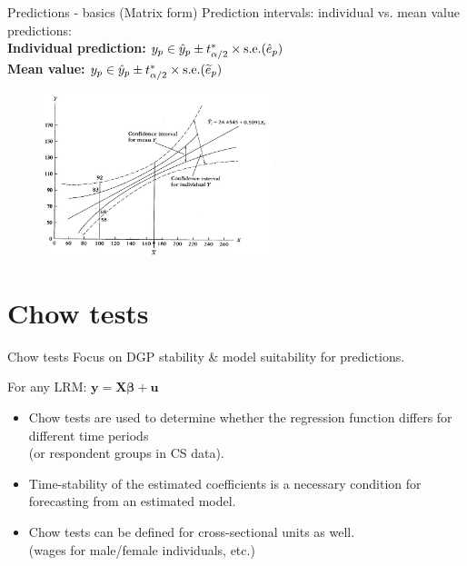 \documentclass{beamer}
\begin{document}
\begin{frame}{Predictions - basics (Matrix form)}
Prediction intervals: individual vs. mean value predictions:\\
\vspace{0.3cm}
\textbf{Individual prediction:} $y_p \in \hat{y}_p \pm t^*_{\alpha/2} \times \textnormal{s.e.}(\hat{e}_p)$\\
\vspace{0.3cm}
\textbf{Mean value:} \hspace{1.7cm} $y_p \in \hat{y}_p \pm t^*_{\alpha/2} \times \textnormal{s.e.}(\widetilde{e}_p)$

\begin{figure}
\includegraphics[width=0.6\textwidth]{img/P3_PredError.jpg}
\end{figure}

\end{frame}

\section{Chow tests}
\begin{frame}{Chow tests}
Focus on DGP stability \& model suitability for predictions.

\medskip
For any LRM: $\bm{y} = \bm{X\beta}+\bm{u}$
\vspace{0.3cm}
\begin{itemize}
\item Chow tests are used to determine whether the regression function differs for different time periods \\(or respondent groups in CS data). 
\item Time-stability of the estimated coefficients is a necessary condition for forecasting from an estimated model.
\item Chow tests can be defined for cross-sectional units as well. \\(wages for male/female individuals, etc.)
\end{itemize}

\end{frame}
\end{document}
